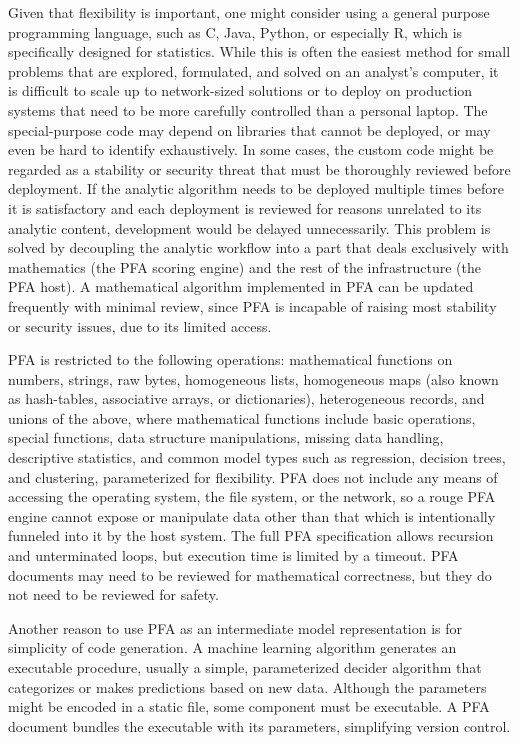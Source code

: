 \documentclass{article}
\theoremstyle{definition}
\begin{document}
Given that flexibility is important, one might consider using a general purpose programming language, such as C, Java, Python, or especially R, which is specifically designed for statistics.  While this is often the easiest method for small problems that are explored, formulated, and solved on an analyst's computer, it is difficult to scale up to network-sized solutions or to deploy on production systems that need to be more carefully controlled than a personal laptop.  The special-purpose code may depend on libraries that cannot be deployed, or may even be hard to identify exhaustively.  In some cases, the custom code might be regarded as a stability or security threat that must be thoroughly reviewed before deployment.  If the analytic algorithm needs to be deployed multiple times before it is satisfactory and each deployment is reviewed for reasons unrelated to its analytic content, development would be delayed unnecessarily.  This problem is solved by decoupling the analytic workflow into a part that deals exclusively with mathematics (the PFA scoring engine) and the rest of the infrastructure (the PFA host).  A mathematical algorithm implemented in PFA can be updated frequently with minimal review, since PFA is incapable of raising most stability or security issues, due to its limited access.

PFA is restricted to the following operations: mathematical functions on numbers, strings, raw bytes, homogeneous lists, homogeneous maps (also known as hash-tables, associative arrays, or dictionaries), heterogeneous records, and unions of the above, where mathematical functions include basic operations, special functions, data structure manipulations, missing data handling, descriptive statistics, and common model types such as regression, decision trees, and clustering, parameterized for flexibility.  PFA does not include any means of accessing the operating system, the file system, or the network, so a rouge PFA engine cannot expose or manipulate data other than that which is intentionally funneled into it by the host system.  The full PFA specification allows recursion and unterminated loops, but execution time is limited by a timeout.  PFA documents may need to be reviewed for mathematical correctness, but they do not need to be reviewed for safety.

Another reason to use PFA as an intermediate model representation is for simplicity of code generation.  A machine learning algorithm generates an executable procedure, usually a simple, parameterized decider algorithm that categorizes or makes predictions based on new data.  Although the parameters might be encoded in a static file, some component must be executable.  A PFA document bundles the executable with its parameters, simplifying version control.
\end{document}
